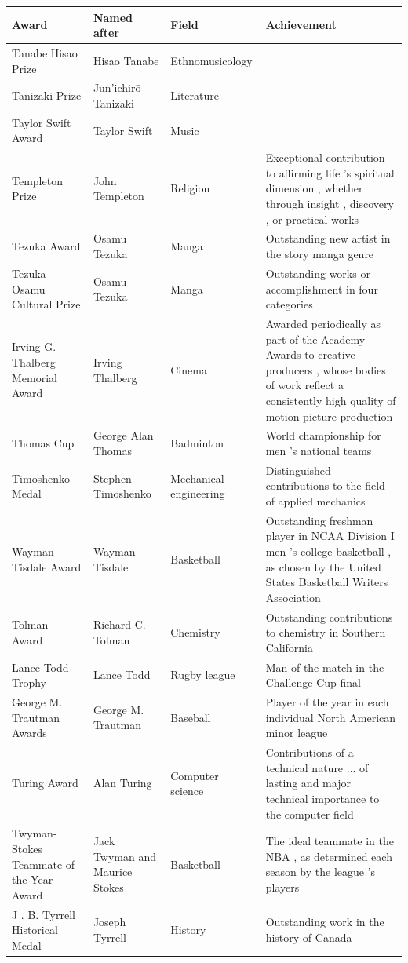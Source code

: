 \documentclass{article}
\begin{document}
\begin{tabular}{llll}
\toprule
Award & Named after & Field & Achievement \\
\midrule
Tanabe Hisao Prize & Hisao Tanabe & Ethnomusicology &  \\
Tanizaki Prize & Jun'ichirō Tanizaki & Literature &  \\
Taylor Swift Award & Taylor Swift & Music &  \\
Templeton Prize & John Templeton & Religion & Exceptional contribution to affirming life 's spiritual dimension , whether through insight , discovery , or practical works \\
Tezuka Award & Osamu Tezuka & Manga & Outstanding new artist in the story manga genre \\
Tezuka Osamu Cultural Prize & Osamu Tezuka & Manga & Outstanding works or accomplishment in four categories \\
Irving G. Thalberg Memorial Award & Irving Thalberg & Cinema & Awarded periodically as part of the Academy Awards to creative producers , whose bodies of work reflect a consistently high quality of motion picture production \\
Thomas Cup & George Alan Thomas & Badminton & World championship for men 's national teams \\
Timoshenko Medal & Stephen Timoshenko & Mechanical engineering & Distinguished contributions to the field of applied mechanics \\
Wayman Tisdale Award & Wayman Tisdale & Basketball & Outstanding freshman player in NCAA Division I men 's college basketball , as chosen by the United States Basketball Writers Association \\
Tolman Award & Richard C. Tolman & Chemistry & Outstanding contributions to chemistry in Southern California \\
Lance Todd Trophy & Lance Todd & Rugby league & Man of the match in the Challenge Cup final \\
George M. Trautman Awards & George M. Trautman & Baseball & Player of the year in each individual North American minor league \\
Turing Award & Alan Turing & Computer science & Contributions of a technical nature ... of lasting and major technical importance to the computer field \\
Twyman-Stokes Teammate of the Year Award & Jack Twyman and Maurice Stokes & Basketball & The ideal teammate in the NBA , as determined each season by the league 's players \\
J . B. Tyrrell Historical Medal & Joseph Tyrrell & History & Outstanding work in the history of Canada \\
\bottomrule
\end{tabular}
\end{document}
